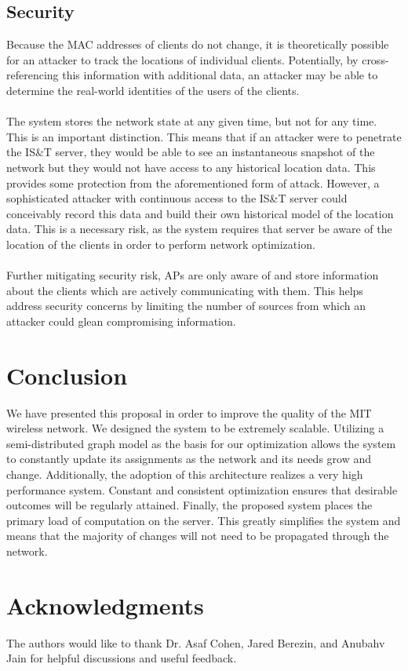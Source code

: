 \documentclass[10pt,journal,compsoc]{IEEEtran}
\begin{document}
		\subsection{Security}
		Because the MAC addresses of clients do not change, it is theoretically possible for an attacker to track the locations of individual clients. Potentially, by cross-referencing this information with additional data, an attacker may be able to determine the real-world identities of the users of the clients.\\
		\\
		The system stores the network state at any given time, but not for any time. This is an important distinction. This means that if an attacker were to penetrate the IS\&T server, they would be able to see an instantaneous snapshot of the network but they would not have access to any historical location data. This provides some protection from the aforementioned form of attack. However, a sophisticated attacker with continuous access to the IS\&T server could conceivably record this data and build their own historical model of the location data. This is a necessary risk, as the system requires that server be aware of the location of the clients in order to perform network optimization.\\
		\\
		Further mitigating security risk, APs are only aware of and store information about the clients which are actively communicating with them. This helps address security concerns by limiting the number of sources from which an attacker could glean compromising information.
		
		\section{Conclusion}
		We have presented this proposal in order to improve the quality of the MIT wireless network. We designed the system to be extremely scalable.  Utilizing a semi-distributed graph model as the basis for our optimization allows the system to constantly update its assignments as the network and its needs grow and change. Additionally, the adoption of this architecture realizes a very high performance system. Constant and consistent optimization ensures that desirable outcomes will be regularly attained. Finally, the proposed system places the primary load of computation on the server. This greatly simplifies the system and means that the majority of changes will not need to be propagated through the network.
		
		\section{Acknowledgments}
		The authors would like to thank Dr. Asaf Cohen, Jared Berezin, and Anubahv Jain for helpful discussions and useful feedback.
		
\end{document}
